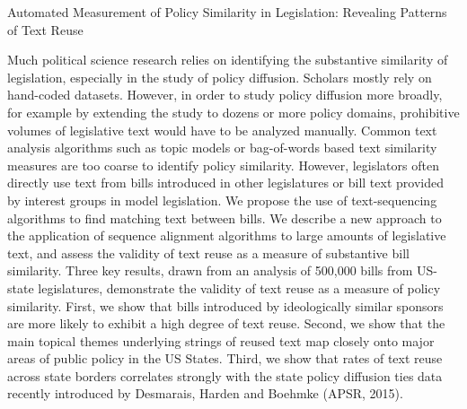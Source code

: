 \documentclass[12pt]{article} %
\begin{document}
 

\begin{center}
    \begin{Large}
    Automated Measurement of Policy Similarity in Legislation: Revealing Patterns of Text Reuse
    \end{Large}

\end{center}

Much political science research relies on identifying the substantive similarity of legislation, especially in the study of policy diffusion. Scholars mostly rely on hand-coded datasets. However, in order to study policy diffusion more broadly, for example by extending the study to dozens or more policy domains, prohibitive volumes of legislative text would have to be analyzed manually. Common text analysis algorithms such as topic models or bag-of-words based text similarity measures are too coarse to identify policy similarity. However, legislators often directly use text from bills introduced in other legislatures or bill text provided by interest groups in model legislation. We propose the use of text-sequencing algorithms to find matching text between bills. We describe a new approach to the application of sequence alignment algorithms to large amounts of legislative text, and assess the validity of text reuse as a measure of substantive bill similarity. Three key results, drawn from an analysis of 500,000 bills from US-state legislatures, demonstrate the validity of text reuse as a measure of policy similarity. First, we show that bills introduced by ideologically similar sponsors are more likely to exhibit a high degree of text reuse. Second, we show that the main topical themes underlying strings of reused text map closely onto major areas of public policy in the US States. Third, we show that rates of text reuse across state borders correlates strongly with the state policy diffusion ties data recently introduced by Desmarais, Harden and Boehmke (APSR, 2015).  \\
\end{document}
